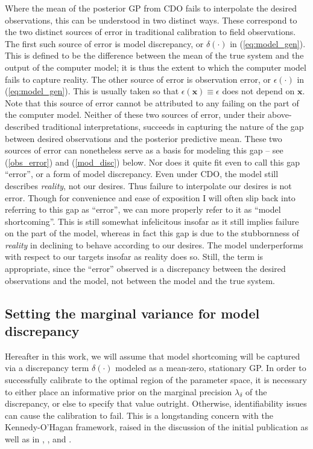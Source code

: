 \documentclass{article}
\begin{document}
Where the mean of the posterior GP from CDO fails to interpolate the desired observations, this can be understood in two distinct ways. 
These correspond to the two distinct sources of error in traditional calibration to field observations. 
The first such source of error is model discrepancy, or $\delta(\cdot)$ in (\ref{eq:model_gen}). 
This is defined to be the difference between the mean of the true system and the output of the computer model; it is thus the extent to which the computer model fails to capture reality. 
The other source of error is observation error, or $\epsilon(\cdot)$ in (\ref{eq:model_gen}). 
This is usually taken so that $\epsilon(\mathbf x) \equiv \epsilon$ does not depend on $\mathbf x$. 
Note that this source of error cannot be attributed to any failing on the part of the computer model. 
Neither of these two sources of error, under their above-described traditional interpretations, succeeds in capturing the nature of the gap between desired observations and the posterior predictive mean. 
These two sources of error can nonetheless serve as a basis for modeling this gap -- see (\ref{obs_error}) and (\ref{mod_disc}) below.
Nor does it quite fit even to call this gap ``error'', or a form of model discrepancy. 
Even under CDO, the model still describes \emph{reality}, not our desires. 
Thus failure to interpolate our desires is not error. 
Though for convenience and ease of exposition I will often slip back into referring to this gap as ``error'', we can more properly refer to it as ``model shortcoming''. 
This is still somewhat infelicitous insofar as it still implies failure on the part of the model, whereas in fact this gap is due to the stubbornness of \emph{reality} in declining to behave according to our desires. %
The model underperforms with respect to our targets insofar as reality does so. 
Still, the term is appropriate, since the ``error'' observed is a discrepancy between the desired observations and the model, not between the model and the true system.

\subsection{Setting the marginal variance for model discrepancy}

Hereafter in this work, we will assume that model shortcoming will be captured via a discrepancy term $\delta(\cdot)$ modeled as a mean-zero, stationary GP. 
%
In order to successfully calibrate to the optimal region of the parameter space, it is necessary to either place an informative prior on the marginal precision $\lambda_\delta$ of the discrepancy, or else to specify that value outright. 
%
Otherwise, identifiability issues can cause the calibration to fail. This is a longstanding concern with the Kennedy-O'Hagan framework, raised in the discussion of the initial publication \cite{Kennedy2001} as well as in \cite{Bayarri2007}, \cite{Tuo2015}, and \cite{Plumlee2017}.
\end{document}

